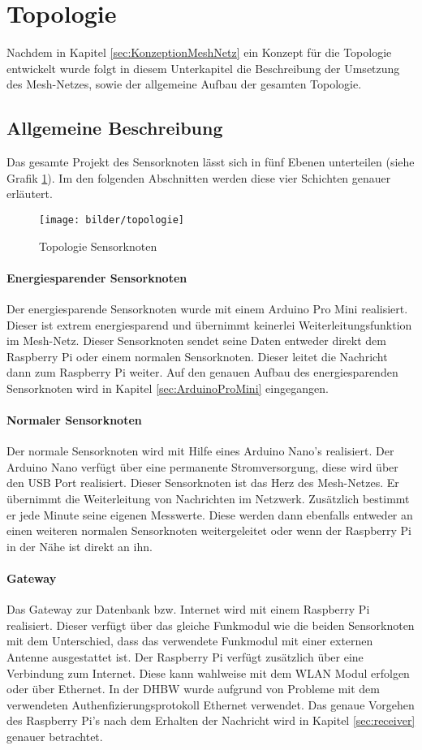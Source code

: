 \section{Topologie}
\label{sec:RealisierungTopologie}
Nachdem in Kapitel \ref{sec:KonzeptionMeshNetz} ein Konzept für die Topologie entwickelt wurde folgt in diesem Unterkapitel die Beschreibung der Umsetzung des Mesh-Netzes, sowie der allgemeine Aufbau der gesamten Topologie. 
\subsection{Allgemeine Beschreibung}
Das gesamte Projekt des Sensorknoten lässt sich in fünf Ebenen unterteilen (siehe Grafik \ref{img:KonzeptionMeshNetz}). Im den folgenden Abschnitten werden diese vier Schichten genauer erläutert.
\begin{figure}
	\centering
	\texttt{[image: bilder/topologie]}
	\caption{Topologie Sensorknoten}
	\label{img:KonzeptionMeshNetz}
\end{figure}
\paragraph{Energiesparender Sensorknoten} Der energiesparende Sensorknoten wurde mit einem Arduino Pro Mini realisiert. Dieser ist extrem energiesparend und übernimmt keinerlei Weiterleitungsfunktion im Mesh-Netz. Dieser Sensorknoten sendet seine Daten entweder direkt dem Raspberry Pi oder einem normalen Sensorknoten. Dieser leitet die  Nachricht dann zum Raspberry Pi weiter. Auf den genauen Aufbau des energiesparenden Sensorknoten wird in Kapitel \ref{sec:ArduinoProMini} eingegangen.
\paragraph{Normaler Sensorknoten} Der normale Sensorknoten wird mit Hilfe eines Arduino Nano’s realisiert. Der Arduino Nano verfügt über eine permanente Stromversorgung, diese wird über den USB Port realisiert. Dieser Sensorknoten ist das Herz des Mesh-Netzes. Er übernimmt die Weiterleitung von Nachrichten im Netzwerk. Zusätzlich bestimmt er jede Minute seine eigenen Messwerte. Diese werden dann ebenfalls entweder an einen weiteren normalen Sensorknoten weitergeleitet oder wenn der Raspberry Pi in der Nähe ist direkt an ihn. 
\paragraph{Gateway} Das Gateway zur Datenbank bzw. Internet wird mit einem Raspberry Pi realisiert. Dieser verfügt über das gleiche Funkmodul wie die beiden Sensorknoten mit dem Unterschied, dass das verwendete Funkmodul mit einer externen Antenne ausgestattet ist. Der Raspberry Pi verfügt zusätzlich über eine Verbindung zum Internet. Diese kann wahlweise mit dem WLAN Modul erfolgen oder über Ethernet. In der DHBW wurde aufgrund von Probleme mit dem verwendeten Authenfizierungsprotokoll  Ethernet verwendet. Das genaue Vorgehen des Raspberry Pi’s nach dem Erhalten der Nachricht wird in Kapitel \ref{sec:receiver} genauer betrachtet.
